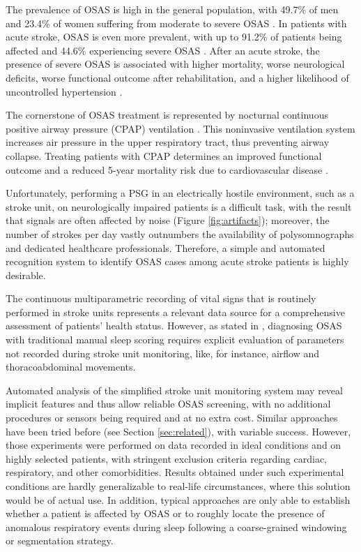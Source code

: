 \documentclass[5p,twocolumn,lefttitle]{elsarticle}
\begin{document}
The prevalence of OSAS is high in the general population, with 49.7\% of men and 23.4\% of women suffering from moderate to severe OSAS \cite{pmid25682233}. In patients with acute stroke, OSAS is even more prevalent, with up to 91.2\% of patients being affected and 44.6\% experiencing severe OSAS \cite{pmid29221777}. 
After an acute stroke, the presence of severe OSAS is associated with higher mortality, worse neurological deficits, worse functional outcome after rehabilitation, and a higher likelihood of uncontrolled hypertension \cite{pmid28522098,pmid25546682}. 

The cornerstone of OSAS treatment is represented by nocturnal continuous positive airway pressure (CPAP) ventilation \cite{pmid16855960}. This noninvasive ventilation system increases air pressure in the upper respiratory tract, thus preventing airway collapse. Treating patients with CPAP determines an improved functional outcome and a reduced 5-year mortality risk due to cardiovascular disease \cite{pmid29523641}.

Unfortunately, performing a PSG in an electrically hostile environment, such as a stroke unit, on neurologically impaired patients is a difficult task, with the result that signals are often affected by noise (Figure \ref{fig:artifacts}); moreover, the number of strokes per day vastly outnumbers the availability of polysomnographs and dedicated healthcare professionals. Therefore, a simple and automated recognition system to identify OSAS cases among acute stroke patients is highly desirable. 

The continuous multiparametric recording of vital signs that is routinely performed in stroke units represents a relevant data source for a comprehensive assessment of patients' health status. However, as stated in \cite{pmid23066376}, diagnosing OSAS with traditional manual sleep scoring requires explicit evaluation of parameters not recorded during stroke unit monitoring, like, for instance, airflow and thoracoabdominal movements. 

Automated analysis of the simplified stroke unit monitoring system may reveal implicit features and thus allow reliable OSAS screening, with no additional procedures or sensors being required and at no extra cost. Similar approaches have been tried before (see Section \ref{sec:related}), with variable success. However, those experiments were performed on data recorded in ideal conditions and on highly selected patients, with stringent exclusion criteria regarding cardiac, respiratory, and other comorbidities. Results obtained under such experimental conditions are hardly generalizable to real-life circumstances, where this solution would be of actual use. In addition, typical approaches are only able to establish whether a patient is affected by OSAS or to roughly locate the presence of anomalous respiratory events during sleep following a coarse-grained windowing or segmentation strategy.
\end{document}
